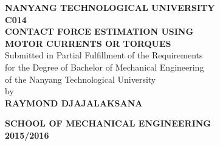 \begin{titlepage}
\begin{center}

\uppercase{\textbf{\large NANYANG TECHNOLOGICAL UNIVERSITY}}
\\[6cm]

\uppercase{\textbf{C014 \\Contact Force Estimation using \\Motor Currents or Torques}}
\\[6cm]

Submitted in Partial Fulfillment of the Requirements\\
for the Degree of Bachelor of Mechanical Engineering\\
of the Nanyang Technological University
\\[0.8cm]

by
\\[0.8cm]

\uppercase{
\textbf{
Raymond Djajalaksana
}}

\vfill

\textsc{\bfseries SCHOOL OF MECHANICAL ENGINEERING}
\\
\textbf{2015/2016}

\end{center}
\end{titlepage}
